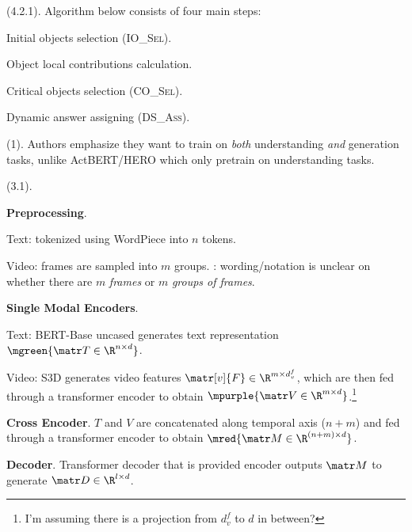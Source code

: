 \documentclass[11pt]{article}
\begin{document}
 (4.2.1). Algorithm below consists of four main steps:
\begin{compactenum}
	\item Initial objects selection (\textsc{IO\_Sel}).
	\item Object local contributions calculation.
	\item Critical objects selection (\textsc{CO\_Sel}).
	\item Dynamic answer assigning (\textsc{DS\_Ass}).
\end{compactenum}








 (1). Authors emphasize they want to train on \textit{both} understanding \textit{and} generation tasks, unlike ActBERT/HERO which only pretrain on understanding tasks. 


 (3.1). 
\begin{compactenum}
	\item \textbf{Preprocessing}. 
	\begin{compactitem}
		\item Text: tokenized using WordPiece into $n$ tokens. 
		\item Video: frames are sampled into $m$ groups. : wording/notation is unclear on whether there are $m$ \textit{frames} or $m$ \textit{groups of frames}.
	\end{compactitem}
	
	\item \textbf{Single Modal Encoders}. 
	\begin{compactitem}
		\item Text: BERT-Base uncased generates text representation $\mgreen{\matr T \in \R^{n \times d}}$. 
		\item Video: S3D generates video features $\matr[v]{F} \in \R^{m \times d_v^f}$, which are then fed through a transformer encoder to obtain $\mpurple{\matr V \in \R^{m \times d}}$.\footnote{I'm assuming there is a projection from $d_v^f$ to $d$ in between?}
	\end{compactitem}

	
	\item \textbf{Cross Encoder}. $T$ and $V$ are concatenated along temporal axis ($n + m$) and fed through a transformer encoder to obtain $\mred{ \matr M \in \R^{(n + m) \times d}}$. 
	
	\item \textbf{Decoder}. Transformer decoder that is provided encoder outputs $\matr M$ to generate $\matr D \in \R^{l \times d}$. 
\end{compactenum}
\end{document}
